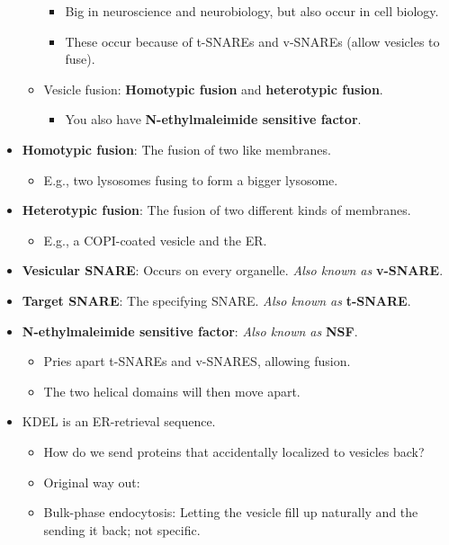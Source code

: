 \documentclass[../notes.tex]{subfiles}
\begin{document}
\begin{itemize}
\begin{itemize}
        \begin{itemize}
            \item Big in neuroscience and neurobiology, but also occur in cell biology.
            \item These occur because of t-SNAREs and v-SNAREs (allow vesicles to fuse).
        \end{itemize}
        \item Vesicle fusion: \textbf{Homotypic fusion} and \textbf{heterotypic fusion}.
        \begin{itemize}
            \item You also have \textbf{N-ethylmaleimide sensitive factor}.
        \end{itemize}
    \end{itemize}
    \item \textbf{Homotypic fusion}: The fusion of two like membranes.
    \begin{itemize}
        \item E.g., two lysosomes fusing to form a bigger lysosome.
    \end{itemize}
    \item \textbf{Heterotypic fusion}: The fusion of two different kinds of membranes.
    \begin{itemize}
        \item E.g., a COPI-coated vesicle and the ER.
    \end{itemize}
    \item \textbf{Vesicular SNARE}: Occurs on every organelle. \emph{Also known as} \textbf{v-SNARE}.
    \item \textbf{Target SNARE}: The specifying SNARE. \emph{Also known as} \textbf{t-SNARE}.
    \item \textbf{N-ethylmaleimide sensitive factor}: \emph{Also known as} \textbf{NSF}.
    \begin{itemize}
        \item Pries apart t-SNAREs and v-SNARES, allowing fusion.
        \item The two helical domains will then move apart.
    \end{itemize}
    \item KDEL is an ER-retrieval sequence.
    \begin{itemize}
        \item How do we send proteins that accidentally localized to vesicles back?
        \item Original way out:
        \item Bulk-phase endocytosis: Letting the vesicle fill up naturally and the sending it back; not specific.

\end{itemize}
\end{itemize}
\end{document}
